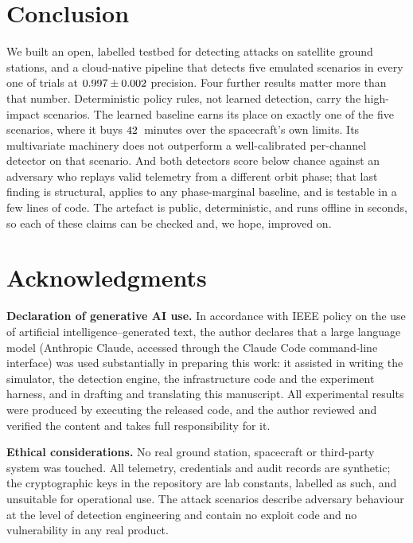 \documentclass[10pt,journal]{IEEEtran}
\begin{document}
\section{Conclusion}

We built an open, labelled testbed for detecting attacks on satellite ground
stations, and a cloud-native pipeline that detects five emulated scenarios in
every one of \expNumSeeds{} trials at $0.997 \pm 0.002$
precision. Four further results matter more than that number. Deterministic
policy rules, not learned detection, carry the high-impact scenarios. The
learned baseline earns its place on exactly one of the five scenarios, where it
buys $42$~minutes over the spacecraft's own limits. Its multivariate
machinery does not outperform a well-calibrated per-channel detector on that
scenario. And both detectors score below chance against an adversary who
replays valid telemetry from a different orbit phase; that last finding is
structural, applies to any phase-marginal baseline, and is testable in a few
lines of code. The artefact is public, deterministic, and runs offline
in seconds, so each of these claims can be checked and, we hope, improved on.

\section*{Acknowledgments}

\textbf{Declaration of generative AI use.} In accordance with IEEE policy on
the use of artificial intelligence--generated text, the author declares that a
large language model (Anthropic Claude, accessed through the Claude Code
command-line interface) was used substantially in preparing this work: it
assisted in writing the simulator, the detection engine, the infrastructure
code and the experiment harness, and in drafting and translating this
manuscript. All experimental results were produced by executing the released
code, and the author reviewed and verified the content and takes full
responsibility for it.

\textbf{Ethical considerations.} No real ground station, spacecraft or
third-party system was touched. All telemetry, credentials and audit records are
synthetic; the cryptographic keys in the repository are lab constants, labelled
as such, and unsuitable for operational use. The attack scenarios describe
adversary behaviour at the level of detection engineering and contain no exploit
code and no vulnerability in any real product.



\end{document}
